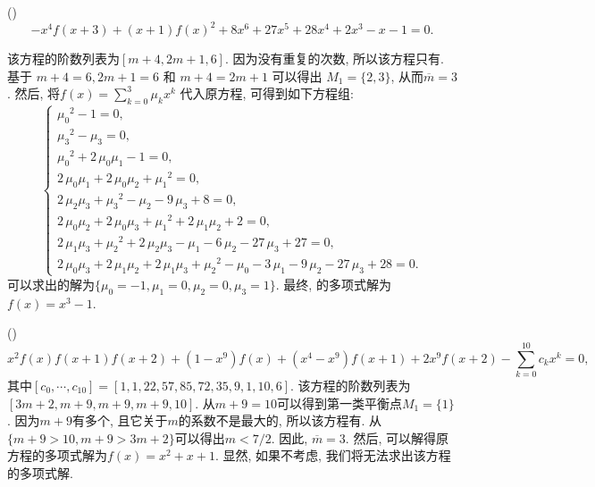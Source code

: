 \begin{example}
(\BPone{})
\begin{equation}
-x^4f(x+3)+(x+1)f(x)^2+8x^6+27x^5+28x^4+2x^3-x-1=0 \label{ep1} .
\end{equation}

该方程的阶数列表为$[m+4,2m+1,6]$. 因为没有重复的次数, 所以该方程只有\BPone{}. 基于 $m+4=6,2m+1=6$ 和 $m+4=2m+1$ 可以得出 $M_1=\{2,3\}$, 从而$\overline m = 3$. 然后, 将$f(x)=\sum\nolimits_{k=0}^3{\mu_k x^k}$ 代入原方程, 可得到如下方程组:
\begin{equation}
\left\{
\begin{array}{l}
    {\mu_{{0}}}^{2}-1=0,                                                                                                  \\
    {\mu_{{3}}}^{2}-\mu_{{3}}=0,                                                                                            \\
    {\mu_{{0}}}^{2}+2\,\mu_{{0}}\mu_{{1}}-1=0,                                                                                \\
    2\,\mu_{{0}}\mu_{{1}}+2\,\mu_{{0}}\mu_{{2}}+{\mu_{{1}}}^{2}=0,                                                                \\
    2\,\mu_{{2}}\mu_{{3}}+{\mu_{{3}}}^{2}-\mu_{{2}}-9\,\mu_{{3}}+8=0,                                                             \\
    2\,\mu_{{0}}\mu_{{2}}+2\,\mu_{{0}}\mu_{{3}}+{\mu_{{1}}}^{2}+2\,\mu_{{1}}\mu_{{2}}+2=0,                                            \\
    2\,\mu_{{1}}\mu_{{3}}+{\mu_{{2}}}^{2}+2\,\mu_{{2}}\mu_{{3}}-\mu_{{1}}-6\,\mu_{{2}}-27\,\mu_{{3}}+27=0,                              \\
    2\,\mu_{{0}}\mu_{{3}}+2\,\mu_{{1}}\mu_{{2}}+2\,\mu_{{1}}\mu_{{3}}+{\mu_{{2}}}^{2}-\mu_{{0}}-3\,\mu_{{1}}-9\,\mu_{{2}}-27\,\mu_{{3}}+28=0.
\end{array}
\right.
\label{ceqs}
\end{equation}
可以求出的解为$\{\mu_0=-1,\mu_1=0,\mu_2=0,\mu_3=1\}$. 最终, 的多项式解为$f(x)=x^3-1$.
\end{example}

\begin{example}
(\BPtwo{})
\begin{equation}
x^2f(x)f(x+1)f(x+2)+(1-x^9)f(x)+(x^4-x^9)f(x+1)+2x^9f(x+2)-\sum_{k=0}^{10}{c_k x^k}=0, \label{ep2}
\end{equation}
其中$[c_0,\cdots,c_{10}]=[1,1,22,57,85,72,35,9,1,10,6]$. 该方程的阶数列表为$[3m+2,m+9,m+9,m+9,10]$. 从$m+9=10$可以得到第一类平衡点$M_1=\{1\}$. 因为$m+9$有多个, 且它关于$m$的系数不是最大的, 所以该方程有\BPtwo{}. 从$\{m+9> 10,m+9> 3m+2\}$可以得出$m< 7/2$. 因此, $\overline m=3$. 然后, 可以解得原方程的多项式解为$f(x)=x^2+x+1$. 显然, 如果不考虑\BPtwo{}, 我们将无法求出该方程的多项式解. 
\end{example}

